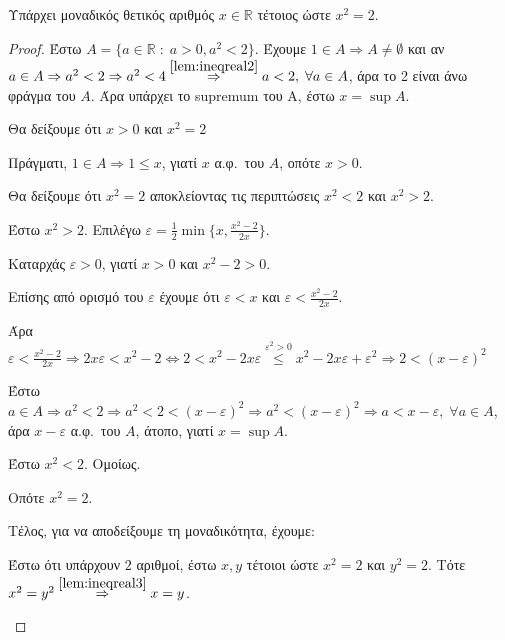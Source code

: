 \begin{mybox2}
\begin{thm}
  Υπάρχει μοναδικός θετικός αριθμός $ x \in \mathbb{R} $ τέτοιος ώστε $ x^{2}=2 $.
\end{thm}
\end{mybox2}
\begin{proof}
\item {}
  Έστω $ A = \{ a \in \mathbb{R} \; : \; a > 0, a^{2} < 2 \}  $. Έχουμε $ 1 \in A 
  \Rightarrow A \neq \emptyset $ 
  και αν $ a \in A \Rightarrow a^{2} < 2 \Rightarrow a^{2} < 4
  \overset{\ref{lem:ineqreal2}}{\Rightarrow} a <2,\; \forall a \in A $, 
  άρα το 2 είναι άνω φράγμα του $A$. Άρα υπάρχει το supremum του Α, έστω 
  $ x = \sup A $. 

  Θα δείξουμε ότι $ x > 0 $ και $ x^{2} = 2 $

  Πράγματι, $ 1 \in A \Rightarrow 1 \leq x $, γιατί $x$ α.φ.\ του $A$, οπότε $ x >0 $.

  Θα δείξουμε ότι $ x^{2} = 2 $ αποκλείοντας τις περιπτώσεις $ x^{2} <2 $ και 
  $ x^{2} > 2 $.
  \begin{myitemize}
    \item Έστω $ x^{2} > 2 $. Επιλέγω $ \varepsilon = \frac{1}{2} \min \{ x, 
      \frac{x^{2}-2}{2x}\} $.

      Καταρχάς $ \varepsilon > 0 $, γιατί $ x>0 $ και $ x^{2} -2 >0 $. 

      Επίσης από ορισμό του $ \varepsilon $ έχουμε ότι  $\varepsilon < x $ και 
      $ \varepsilon < \frac{x^{2}-2}{2x}$. 

      Άρα $ \varepsilon < \frac{x^{2}-2}{2x} \Rightarrow 
      2x \varepsilon < x^{2} - 2 \Leftrightarrow 2 < x^{2} -2x \varepsilon 
      \overset{\varepsilon ^{2}>0}{\leq}
      x^{2} -2x \varepsilon + \varepsilon ^{2} \Rightarrow 2 
      < (x- \varepsilon )^{2}   $

      Έστω $ a \in A \Rightarrow a^{2} <2 \Rightarrow a^{2}<2< 
      (x- \varepsilon )^{2} \Rightarrow a^{2}< (x- \varepsilon )^{2} 
      \Rightarrow a < x- \varepsilon, \; \forall a \in A$, 
      άρα $ x - \varepsilon $ α.φ.\ του $A$, άτοπο, γιατί $ x= \sup A $.

    \item Έστω $ x^{2}<2 $. Ομοίως.

      Οπότε $ x^{2}=2 $. 

      Τέλος, για να αποδείξουμε τη μοναδικότητα, έχουμε:

      Έστω ότι υπάρχουν $ 2 $ αριθμοί, έστω $ x,y $ τέτοιοι ώστε $ x^{2} =2 $ 
      και $ y^{2}=2 $. Τότε $ x^{2}=y^{2} \overset{\ref{lem:ineqreal3}}
      {\Rightarrow} x =y $.
  \end{myitemize}
\end{proof}

